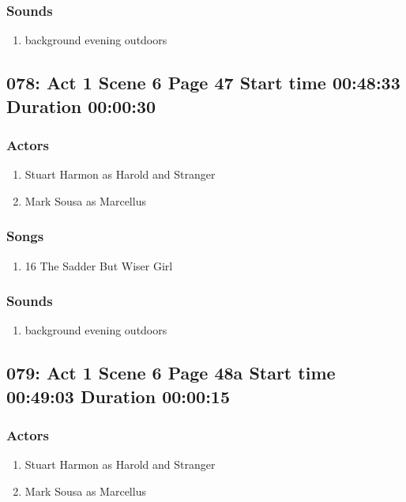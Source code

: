 \subsubsection{Sounds}
\begin{enumerate}
\item background evening outdoors
\end{enumerate}
\subsection{078: Act 1 Scene 6 Page 47 Start time 00:48:33 Duration 00:00:30}

\subsubsection{Actors}
\begin{enumerate}
\item Stuart Harmon as Harold and Stranger
\item Mark Sousa as Marcellus
\end{enumerate}

\subsubsection{Songs}
\begin{enumerate}
\item 16 The Sadder But Wiser Girl
\end{enumerate}\subsubsection{Sounds}
\begin{enumerate}
\item background evening outdoors
\end{enumerate}
\subsection{079: Act 1 Scene 6 Page 48a Start time 00:49:03 Duration 00:00:15}

\subsubsection{Actors}
\begin{enumerate}
\item Stuart Harmon as Harold and Stranger
\item Mark Sousa as Marcellus
\end{enumerate}

